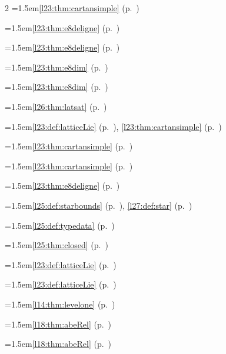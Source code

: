 \begin{multicols}{2}
\hangindent=1.5em\quad \ref{l23:thm:cartansimple} (p.~\pageref{l23:thm:cartansimple})\par
\hangindent=1.5em\quad \ref{l23:thm:e8deligne} (p.~\pageref{l23:thm:e8deligne})\par
\hangindent=1.5em\quad \ref{l23:thm:e8deligne} (p.~\pageref{l23:thm:e8deligne})\par
\hangindent=1.5em\quad \ref{l23:thm:e8dim} (p.~\pageref{l23:thm:e8dim})\par
\hangindent=1.5em\quad \ref{l23:thm:e8dim} (p.~\pageref{l23:thm:e8dim})\par
\hangindent=1.5em\quad \ref{l26:thm:latsat} (p.~\pageref{l26:thm:latsat})\par
\hangindent=1.5em\quad \ref{l23:def:latticeLie} (p.~\pageref{l23:def:latticeLie}), \ref{l23:thm:cartansimple} (p.~\pageref{l23:thm:cartansimple})\par
\hangindent=1.5em\quad \ref{l23:thm:cartansimple} (p.~\pageref{l23:thm:cartansimple})\par
\hangindent=1.5em\quad \ref{l23:thm:cartansimple} (p.~\pageref{l23:thm:cartansimple})\par
\hangindent=1.5em\quad \ref{l23:thm:e8deligne} (p.~\pageref{l23:thm:e8deligne})\par
\hangindent=1.5em\quad \ref{l25:def:starbounds} (p.~\pageref{l25:def:starbounds}), \ref{l27:def:star} (p.~\pageref{l27:def:star})\par
\hangindent=1.5em\quad \ref{l25:def:typedata} (p.~\pageref{l25:def:typedata})\par
\hangindent=1.5em\quad \ref{l25:thm:closed} (p.~\pageref{l25:thm:closed})\par
\hangindent=1.5em\quad \ref{l23:def:latticeLie} (p.~\pageref{l23:def:latticeLie})\par
\hangindent=1.5em\quad \ref{l23:def:latticeLie} (p.~\pageref{l23:def:latticeLie})\par
\hangindent=1.5em\quad \ref{l14:thm:levelone} (p.~\pageref{l14:thm:levelone})\par
\hangindent=1.5em\quad \ref{l18:thm:abeRel} (p.~\pageref{l18:thm:abeRel})\par
\hangindent=1.5em\quad \ref{l18:thm:abeRel} (p.~\pageref{l18:thm:abeRel})\par

\end{multicols}
